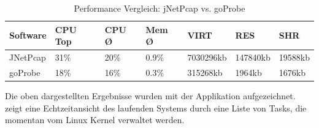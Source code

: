 \begin{table}[h]
\begin{tabular}{l|l|l|l|l|l|l}
\textbf{Software} & \textbf{CPU Top} & \textbf{CPU Ø} & \textbf{Mem Ø} & \textbf{VIRT\footnotemark[1]} & \textbf{RES\footnotemark[2]} & \textbf{SHR\footnotemark[3]} \\ \hline
JNetPcap          & 31\%             & 20\%           & 0.9\%          & 7030296kb       & 147840kb       & 19588kb        \\ \hline
goProbe           & 18\%             & 16\%           & 0.3\%          & 315268kb        & 1964kb         & 1676kb         \\
\end{tabular}
\caption{Performance Vergleich: jNetPcap vs. goProbe}
\end{table}

Die oben dargestellten Ergebnisse wurden mit der Applikation  aufgezeichnet.  zeigt eine Echtzeitansicht des laufenden Systems durch eine Liste von Tasks, die momentan vom Linux Kernel verwaltet werden\cite[:12]{ubuntu_top}.

